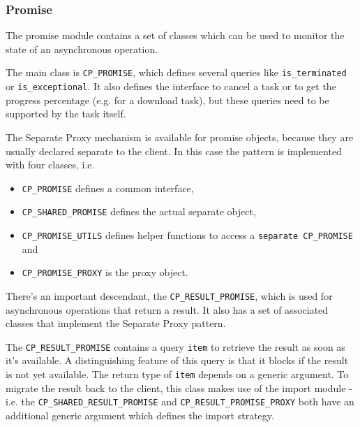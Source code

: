 % 

\subsubsection{Promise}
\label {sec:promise}

The promise module contains a set of classes which can be used to monitor the state of an asynchronous operation.

The main class is \lstinline!CP_PROMISE!, which defines several queries like \lstinline!is_terminated! or \lstinline!is_exceptional!.
It also defines the interface to cancel a task or to get the progress percentage (e.g. for a download task), but these queries need to be supported by the task itself.

The Separate Proxy mechanism is available for promise objects, because they are usually declared separate to the client.
In this case the pattern is implemented with four classes, i.e.
\begin{itemize}
 \item \lstinline!CP_PROMISE! defines a common interface,
 \item \lstinline!CP_SHARED_PROMISE! defines the actual separate object,
 \item \lstinline!CP_PROMISE_UTILS! defines helper functions to access a \lstinline!separate CP_PROMISE! and
 \item \lstinline!CP_PROMISE_PROXY! is the proxy object.
\end{itemize}

There's an important descendant, the \lstinline!CP_RESULT_PROMISE!, which is used for asynchronous operations that return a result.
It also has a set of associated classes that implement the Separate Proxy pattern.

The \lstinline!CP_RESULT_PROMISE! contains a query \lstinline!item! to retrieve the result as soon as it's available.
A distinguishing feature of this query is that it blocks if the result is not yet available.
The return type of \lstinline!item! depends on a generic argument.
To migrate the result back to the client, this class makes use of the import module - i.e. the \lstinline!CP_SHARED_RESULT_PROMISE! and \lstinline!CP_RESULT_PROMISE_PROXY! both have an additional generic argument which defines the import strategy.


